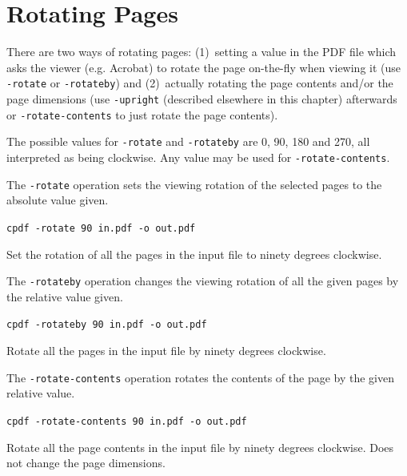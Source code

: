\documentclass{book}
\begin{document}
  \section{Rotating Pages}

There are two ways of rotating pages: (1)~setting a value in the PDF file which
asks the viewer (e.g. Acrobat) to rotate the page on-the-fly when viewing it
(use \texttt{-rotate} or \texttt{-rotateby}) and (2)~actually rotating the page
contents and/or the page dimensions (use \texttt{-upright} (described elsewhere in this chapter) afterwards or
\texttt{-rotate-contents} to just rotate the page contents).

  The possible values for \texttt{-rotate} and \texttt{-rotateby} are 0, 90,
180 and 270, all interpreted as being clockwise. Any value may be used for
\texttt{-rotate-contents}.
  
The \texttt{-rotate} operation sets the viewing rotation of the selected pages to
the absolute value given.

  \begin{framed}
  \noindent\small\verb!cpdf -rotate 90 in.pdf -o out.pdf!

  \vspace{2.5mm}
  \noindent Set the rotation of all the pages in the input file to ninety degrees clockwise.
  \end{framed}

  \noindent The \texttt{-rotateby} operation changes the viewing rotation of all the
given pages by the relative value given.

  \begin{framed}
  \noindent\small\verb!cpdf -rotateby 90 in.pdf -o out.pdf!

  \vspace{2.5mm}
  \noindent Rotate all the pages in the input file by ninety degrees clockwise.
  \end{framed}

  \noindent The \texttt{-rotate-contents} operation rotates the contents of the page by the given relative value.

  \begin{framed}
  \noindent\small\verb!cpdf -rotate-contents 90 in.pdf -o out.pdf!

  \vspace{2.5mm}

  \noindent Rotate all the page contents in the input file by
ninety degrees clockwise. Does not change the page dimensions.
  \end{framed}
\end{document}
